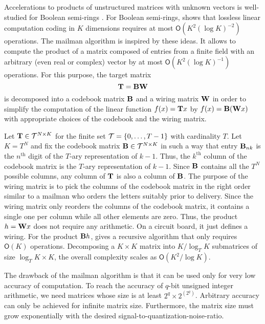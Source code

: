\documentclass[twocolumn]{IEEEtran}
\begin{document}
Accelerations to products of unstructured matrices with unknown vectors is well-studied for Boolean semi-rings \cite{kronrod:70,williams:07}. For Boolean semi-rings, \cite{williams:07} shows that lossless linear computation coding in $K$ dimensions requires at most ${\mathsf O}(K^2(\log K)^{-2})$ operations.
The mailman algorithm \cite{liberty:09} is inspired by these ideas.
It allows to compute the product of a matrix composed of entries from a finite field with an arbitrary (even real or complex) vector by at most ${\mathsf O}(K^2(\log K)^{-1})$ operations.
For this purpose, the target matrix 
\begin{equation}
\mathbf{T} = \mathbf{B}\mathbf{W}
\label{decomp}
\end{equation}
is decomposed into a codebook matrix $\mathbf{B}$ and a wiring matrix $\mathbf{W}$ in order to simplify the computation of the linear function $f(x) = \mathbf{T} x$ by $f(x) = \mathbf{B}(\mathbf{W} x)$ with appropriate choices of the codebook and the wiring matrix.

Let $\mathbf{T}\in {\cal T}^{N\times K}$ for the finite set ${\cal T}=\{0,\dots,T-1\}$ with cardinality $T$.
Let $K=T^N$ and fix the codebook matrix $\mathbf{B} \in {\cal T}^{N\times K}$ in such a way that entry $\mathbf{B}_{nk}$ is the $n^\text{th}$ digit of the $T$-ary representation of $k-1$. Thus, the $k^{\text{th}}$ column of the codebook matrix is the $T$-ary representation of $k-1$.
Since $\mathbf{B}$ contains all the $T^N$ possible columns, any column of $\mathbf{T}$ is also a column of $\mathbf{B}$.
The purpose of the wiring matrix is to pick the columns of the codebook matrix in the right order similar to a mailman who orders the letters suitably prior to delivery.
Since the wiring matrix only reorders the columns of the codebook matrix, it contains a single one per column while all other elements are zero. Thus, the product $h = \mathbf{W} x$ does not require any arithmetic. On a circuit board, it just defines a wiring. For the product $\mathbf{B} h$, \cite{liberty:09} gives a recursive algorithm that only requires ${\mathsf O}(K)$ operations.
Decomposing a $K\times K$ matrix into $K/\log_T K$ submatrices of size $\log_TK\times K$, the overall complexity scales as ${\mathsf O}(K^2/\log K)$.

The drawback of the mailman algorithm is that it can be used only for very low accuracy of computation. To reach the accuracy of $q$-bit unsigned integer arithmetic, we need matrices whose size is at least $2^q \times 2^{(2^q)}$. Arbitrary accuracy can only be achieved for infinite matrix size. Furthermore, the matrix size must grow exponentially with the desired signal-to-quantization-noise-ratio.
\end{document}
